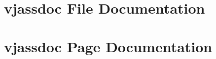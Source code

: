 \documentclass[a4paper]{book}
\begin{document}
\chapter{vjassdoc File Documentation}











































\chapter{vjassdoc Page Documentation}

\printindex
\end{document}
